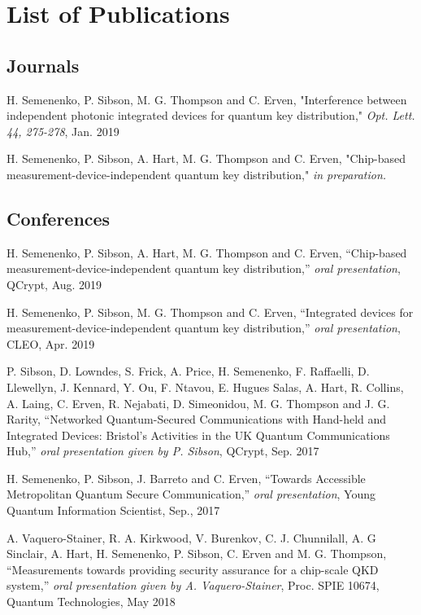 %
{\setlength{\parindent}{0pt} %
\abnormalparskip{18pt} %
\chapter*{List of Publications}
\section*{Journals}

H. Semenenko, P. Sibson, M. G. Thompson and C. Erven, "Interference between independent photonic integrated devices for quantum key distribution," \textit{Opt. Lett. 44, 275-278}, Jan. 2019 

H. Semenenko, P. Sibson, A. Hart, M. G. Thompson and C. Erven, "Chip-based measurement-device-independent quantum key distribution," \textit{in preparation.} 

\section*{Conferences}

H. Semenenko, P. Sibson, A. Hart, M. G. Thompson and C. Erven, ``Chip-based measurement-device-independent quantum key distribution,'' \textit{oral presentation}, QCrypt, Aug. 2019

H. Semenenko, P. Sibson, M. G. Thompson and C. Erven, ``Integrated devices for measurement-device-independent quantum key distribution,'' \textit{oral presentation}, CLEO, Apr. 2019

P. Sibson, D. Lowndes, S. Frick, A. Price, H. Semenenko, F. Raffaelli, D. Llewellyn, J. Kennard, Y. Ou, F. Ntavou, E. Hugues Salas, A. Hart, R. Collins, A. Laing, C. Erven, R. Nejabati, D. Simeonidou, M. G. Thompson and J. G. Rarity, ``Networked Quantum-Secured Communications with Hand-held and Integrated Devices: Bristol’s Activities in the UK Quantum Communications Hub,'' \textit{oral presentation given by P. Sibson}, QCrypt, Sep. 2017

H. Semenenko, P. Sibson, J. Barreto and C. Erven, ``Towards Accessible Metropolitan Quantum Secure Communication,'' \textit{oral presentation}, Young Quantum Information Scientist, Sep., 2017 

A. Vaquero-Stainer, R. A. Kirkwood, V. Burenkov, C. J. Chunnilall, A. G Sinclair, A. Hart, H. Semenenko, P. Sibson, C. Erven and M. G. Thompson, ``Measurements towards providing security assurance for a chip-scale QKD system,'' \textit{oral presentation given by A. Vaquero-Stainer}, Proc. SPIE 10674, Quantum Technologies, May 2018

}
